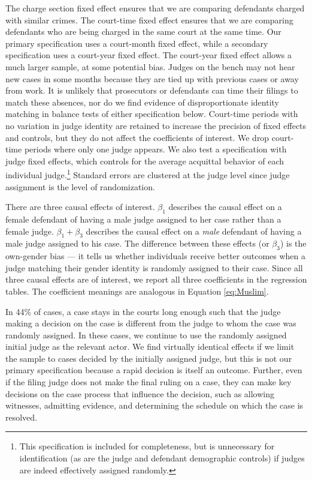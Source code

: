 \documentclass[12pt,english]{article}
\begin{document}
The charge section fixed effect ensures that we are comparing defendants charged with similar crimes. The court-time fixed effect ensures that we are comparing defendants who are being charged in the same court at the same time. Our primary specification uses a court-month fixed effect, while a secondary specification uses a court-year fixed effect. The court-year fixed effect allows a much larger sample, at some potential bias. Judges on the bench may not hear new cases in some months because they are tied up with previous cases or away from work. It is unlikely that prosecutors or defendants can time their filings to match these absences, nor do we find evidence of disproportionate identity matching in balance tests of either specification below. Court-time periods with no variation in judge identity are retained to increase the precision of fixed effects and controls, but they do not affect the coefficients of interest. We drop court-time periods where only one judge appears. We also test a specification with judge fixed effects, which controls for the average acquittal behavior of each individual judge.\footnote{This specification is included for completeness, but is unnecessary for identification (as are the judge and defendant demographic controls) if judges are indeed effectively assigned randomly.} Standard errors are clustered at the judge level since judge assignment is the level of randomization.

There are three causal effects of interest. $\beta_1$ describes the causal effect on a female defendant of having a male judge assigned to her case rather than a female judge. $\beta_1 + \beta_3$ describes the causal effect on a \textit{male} defendant of having a male judge assigned to his case. The difference between these effects (or $\beta_3$) is the own-gender bias --- it tells us whether individuals receive better outcomes when a judge matching their gender identity is randomly assigned to their case. %
Since all three causal effects are of interest, we report all three coefficients in the regression tables. The coefficient meanings are analogous in Equation \ref{eq:Muslim}. 

In 44\% of cases, a case stays in the courts long enough such that the judge making a decision on the case is different from the judge to whom the case was randomly assigned. In these cases, we continue to use the randomly assigned initial judge as the relevant actor.
We find virtually identical effects if we limit the sample to cases decided by the initially assigned judge, but this is not our primary specification because a rapid decision is itself an outcome. Further, even if the filing judge does not make the final ruling on a case, they can make key decisions on the case process that influence the decision, such as allowing witnesses, admitting evidence, and determining the schedule on which the case is resolved.
\end{document}

